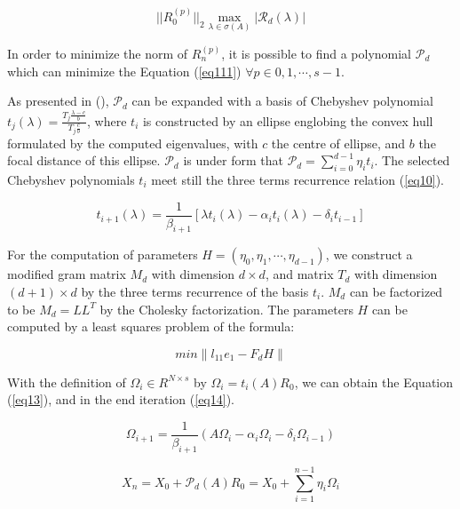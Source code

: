 \begin{equation}
\label{eq111}
||R_0^{(p)}||_2 \max_{\lambda \in \sigma(A)}|\mathcal{R}_d(\lambda)|
\end{equation}

In order to minimize the norm of $R_n^{(p)}$, it is possible to find a polynomial $\mathcal{P}_d$ which can minimize the Equation (\ref{eq111}) $\forall p \in 0,1,\cdots,s-1$.

As presented in (\cite{wu2018distributed}), $\mathcal{P}_d$ can be expanded with a basis of Chebyshev polynomial $t_j(\lambda)=\frac{T_j \frac{\lambda-c}{b}}{T_j \frac{c}{b}}$, where $t_i$ is constructed by an ellipse englobing the convex hull formulated by the computed eigenvalues, with $c$ the centre of ellipse, and $b$ the focal distance of this ellipse. $\mathcal{P}_d$ is under form that $\mathcal{P}_d=\sum_{i=0}^{d-1}\eta_it_i$. The selected Chebyshev polynomials \(t_i\) meet still the three terms recurrence relation (\ref{eq10}). 

\begin{equation}
\label{eq10}
t_{i+1}(\lambda)=\frac{1}{\beta_{i+1}}[\lambda t_i(\lambda)-\alpha_i t_i(\lambda)-\delta_i t_{i-1}]
\end{equation}


For the computation of parameters $H=(\eta_0,\eta_1,\cdots,\eta_{d-1})$, we construct a modified gram matrix $M_d$ with dimension $d \times d$, and matrix $T_d$ with dimension $(d+1) \times d$ by the three terms recurrence of the basis $t_i$. $M_d$ can be factorized to be $M_d=LL^T$ by the Cholesky factorization. The parameters $H$ can be computed by a least squares problem of the formula:


\begin{equation}
\label{eq112}
min \|l_{11}e_1-F_d H\|
\end{equation}


With the definition of \(\Omega_i \in R^{N \times s}\) by \(\Omega_i=t_i(A)R_0\), we can obtain the Equation (\ref{eq13}), and in the end iteration  (\ref{eq14}).

\begin{equation}
\label{eq13}
\Omega_{i+1}=\frac{1}{\beta_{i+1}}(A\Omega_i-\alpha_i\Omega_i-\delta_i\Omega_{i-1})
\end{equation}

\begin{equation}
\label{eq14}
X_n=X_0+\mathcal{P}_d(A)R_0=X_0+\sum_{i=1}^{n-1}\eta_i\Omega_i
\end{equation}

